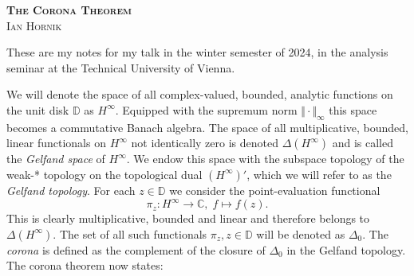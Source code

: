 \documentclass[letterpaper, 11pt]{article}
\newcommand{\C}{\mathbb{C}}
\newcommand{\D}{\mathbb{D}}
\newcommand{\1}{\mathds{1}}
\theoremstyle{definition}
\begin{document}
\author{\normalsize Ian Hornik}
\date{\vspace{-0.8em}\normalsize\today}


\begin{center}
  {\LARGE\scshape\bfseries{The Corona Theorem}} \\
  \scshape{Ian Hornik}
\end{center}

\vspace{1em}

These are my notes for my talk in the winter semester of 2024, in the analysis seminar at the Technical University of Vienna.


We will denote the space of all complex-valued, bounded, analytic functions on the unit disk $\D$ as $H^\infty$. Equipped with the supremum norm $\Vert \cdot \Vert_\infty$ this space becomes a commutative Banach algebra. The space of all multiplicative, bounded, linear functionals on $H^\infty$ not identically zero is denoted $\Delta(H^\infty)$ and is called the \emph{Gelfand space} of $H^\infty$. We endow this space with the subspace topology of the weak\nobreakdash-* topology on the topological dual $(H^\infty)'$, which we will refer to as the \emph{Gelfand topology}. For each $z \in \D$ we consider the point-evaluation functional
\begin{equation*}
  \pi_z : H^\infty \to \C,\; f \mapsto f(z).
\end{equation*}
This is clearly multiplicative, bounded and linear and therefore belongs to $\Delta(H^\infty)$. The set of all such functionals $\pi_z, z \in \D$ will be denoted as $\Delta_0$. The \emph{corona} is defined as the complement of the closure of $\Delta_0$ in the Gelfand topology. The corona theorem now states:
\end{document}
